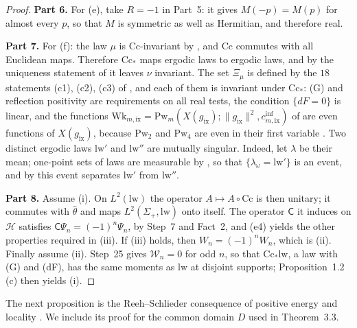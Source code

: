\documentclass[11pt,letterpaper,reqno]{amsart}
\theoremstyle{definition}
\begin{document}
\begin{proof}
\textbf{Part 6.}
For (e), take $R=-1$ in Part~5: it gives $M(-p)=M(p)$ for almost every $p$, so that $M$ is symmetric as well as Hermitian, and therefore real.

\textbf{Part 7.}
For (f): the law $\mu$ is $\mathrm{Cc}$-invariant by \cite[Theorem~44\,(P3)]{QEDIII}, and $\mathrm{Cc}$ commutes with all Euclidean maps.
Therefore $\mathrm{Cc}_*$ maps ergodic laws to ergodic laws, and by the uniqueness statement of \cite[(n7)]{QEDIII} it leaves $\nu$ invariant.
The set $\Xi_\mu$ is defined by the $18$ statements (c1), (c2), (c3) of \cite[Theorem~44\,(B5), (D)]{QEDIII}, and each of them is invariant under $\mathrm{Cc}_*$: (G) and reflection positivity are requirements on all real tests, the condition $\{dF=0\}$ is linear, and the functions $\mathrm{Wk}_{m,\mathrm{ix}}=\allowbreak \mathrm{Pw}_m(X(g_{\mathrm{ix}});\|g_{\mathrm{ix}}\|^2,\allowbreak c^{\mathrm{inf}}_{m,\mathrm{ix}})$ of \cite[Theorem~44\,(B4)]{QEDIII} are even functions of $X(g_{\mathrm{ix}})$, because $\mathrm{Pw}_2$ and $\mathrm{Pw}_4$ are even in their first variable \cite[Section~I.7.6]{QEDIII}.
Two distinct ergodic laws $\mathrm{lw}'$ and $\mathrm{lw}''$ are mutually singular.
Indeed, let $\lambda$ be their mean; one-point sets of laws are measurable by \cite[Proposition~45.6\,(d0)]{QEDIII}, so that $\{\lambda_\omega=\mathrm{lw}'\}$ is an event, and by \cite[Proposition~45.6\,(a), (a$''$)]{QEDIII} this event separates $\mathrm{lw}'$ from $\mathrm{lw}''$.

\textbf{Part 8.}
Assume (i).
On $L^2(\mathrm{lw})$ the operator $A\mapsto A\circ\mathrm{Cc}$ is then unitary; it commutes with $\hat\theta$ and maps $L^2(\Sigma_+,\mathrm{lw})$ onto itself.
The operator $\mathsf C$ it induces on $\mathcal H$ satisfies $\mathsf C\Psi_n=(-1)^n\Psi_n$, by Step~7 and Fact~2, and (e4) yields the other properties required in (iii).
If (iii) holds, then $W_n=(-1)^nW_n$, which is (ii).
Finally assume (ii).
Step~25 gives $\mathcal W_n=0$ for odd $n$, so that $\mathrm{Cc}_*\mathrm{lw}$, a law with (G) and (dF), has the same moments as $\mathrm{lw}$ at disjoint supports; Proposition~1.2\,(c) then yields (i).
\end{proof}

The next proposition is the Reeh--Schlieder consequence of positive
energy and locality \cite{ReehSchlieder1961}. We include its proof for
the common domain $D$ used in Theorem~3.3.
\end{document}
